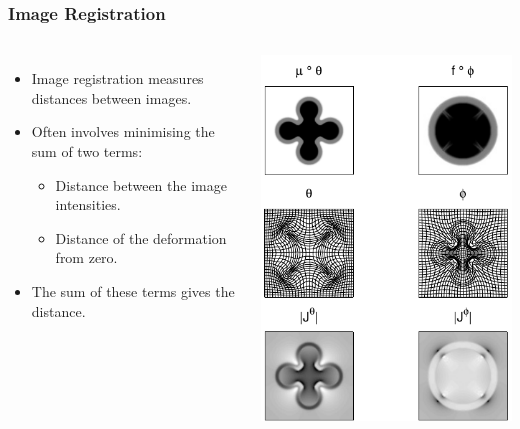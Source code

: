 \documentclass{beamer}
\begin{document}
\begin{frame}
\frametitle{Image Registration}
\begin{columns}[c]
\begin{itemize}
\item Image registration measures distances between images.
\item Often involves minimising the sum of two terms:
\begin{itemize}
\item Distance between the image intensities.
\item Distance of the deformation from zero.
\end{itemize}
\item The sum of these terms gives the distance.
\end{itemize}
\includegraphics[width=\textwidth]{shoot2d}
\end{columns}
\end{frame}
\end{document}
